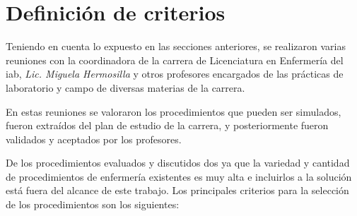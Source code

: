 \section{Definición de criterios}
\label{sec:definicion_criterios}

Teniendo en cuenta lo expuesto en las secciones anteriores, se realizaron varias
reuniones con la coordinadora de la carrera de Licenciatura en Enfermería del
\Gls{iab}, \textit{Lic. Miguela Hermosilla} y otros profesores encargados de las
prácticas de laboratorio y campo de diversas materias de la carrera.

En estas reuniones se valoraron los procedimientos que pueden ser simulados,
 fueron extraídos del plan de
estudio de la carrera, y posteriormente fueron validados y aceptados por los
profesores.

De los procedimientos evaluados y discutidos  dos ya
que la variedad y cantidad de procedimientos de enfermería existentes es muy
alta e incluirlos a la solución está fuera del alcance de este trabajo. Los
principales criterios para la selección de los procedimientos son los
siguientes:


